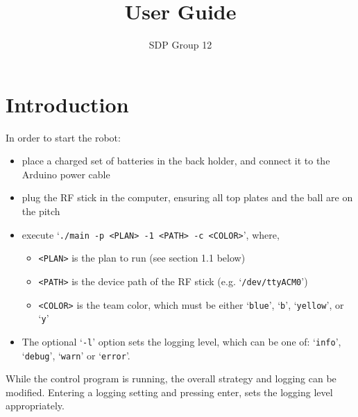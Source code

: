 ﻿\documentclass[12pt,a4paper]{article}
\author{SDP Group 12}
\title{User Guide}
\begin{document}
\maketitle




\section{Introduction}

In order to start the robot: 

\begin{itemize}
    \item place a charged set of batteries in the back holder, and connect it to the Arduino power cable
    \item plug the RF stick in the computer, ensuring all top plates and the ball are on the pitch
    \item execute `\texttt{./main -p <PLAN> -1 <PATH> -c <COLOR>}', where,
    \begin{itemize}
        \item \texttt{<PLAN>} is the plan to run (see section 1.1 below)
        \item \texttt{<PATH>} is the device path of the RF stick (e.g. `\verb$/dev/ttyACM0$')
        \item \texttt{<COLOR>} is the team color, which must be either `\texttt{blue}', `\texttt{b}', `\texttt{yellow}', or `\texttt{y}'
    \end{itemize}
    \item The optional `\texttt{-l}' option sets the logging level, which can be one of: `\texttt{info}', `\texttt{debug}', `\texttt{warn}' or `\texttt{error}'.
\end{itemize}

While the control program is running, the overall strategy and logging can be modified. 
Entering a logging setting and pressing enter, sets the logging level appropriately.
\end{document}
